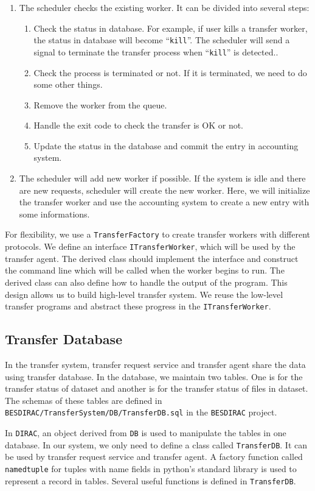 \begin{enumerate}
\item The scheduler checks the existing worker.
It can be divided into several steps:
\begin{enumerate}
    \item Check the status in database.
          For example, if user kills a transfer worker, the status in
          database will become ``\verb"kill"''.
          The scheduler will
          send a signal to terminate the
          transfer process when ``\verb"kill"'' is detected..
    \item Check the process is terminated or not.
          If it is terminated, we need to do some other things.
    \item Remove the worker from the queue.
    \item Handle the exit code to check the transfer is OK or not.
    \item Update the status in the database 
          and commit the entry in accounting system.
\end{enumerate}
\item The scheduler will add new worker if possible.
If the system is idle and there are new requests,
scheduler will create the new worker.
Here, we will initialize the transfer worker and use the accounting
system to create a new entry with some informations.
\end{enumerate}
For flexibility, we use a {\tt TransferFactory} to create transfer workers
with different protocols. 
We define an interface {\tt ITransferWorker},
which will be used by the transfer agent. The derived class should
implement the interface and construct the command line which will 
be called when the worker begins to run.
The derived class can also define how to handle the output of the 
program.
This design allows us to build high-level transfer system.
We reuse the low-level transfer programs and abstract these
progress in the {\tt ITransferWorker}.

\subsection{Transfer Database}

In the transfer system, transfer request service and transfer agent
share the data using transfer database. In the database, we maintain
two tables.
One is for the transfer status of dataset 
and another is for the transfer status of files in dataset. 
The schemas of these tables are defined 
in {\tt BESDIRAC/TransferSystem/DB/TransferDB.sql} in the {\tt BESDIRAC}
project\cite{bib:besdirac}.

In {\tt DIRAC}, an object derived from {\tt DB} is used to manipulate
the tables in one database. In our system, we only need to define 
a class called {\tt TransferDB}. It can be used by transfer request 
service and transfer agent. A factory function called \verb"namedtuple" 
for tuples with name fields
in python's standard library
is used to represent a record in tables.
Several useful functions is defined in {\tt TransferDB}.
